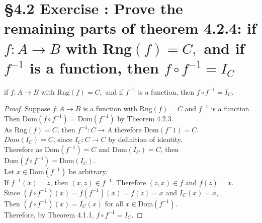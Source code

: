 \documentclass[a4paper,11pt]{article}
\begin{document}
\section*{\S 4.2 Exercise : Prove the remaining parts of theorem 4.2.4: if \(f:A\rightarrow B\) with Rng\({(f)=C,}\) and if \(f^{-1}\) is a function, then \(f \circ 
f^{-1}=I_{C}\)}
\begin{theorem1}
if \(f: A \rightarrow B\) with Rng\({(f)=C,}\) and if \(f^{-1}\) is a function, then \(f \circ 
f^{-1}=I_{C}\).
   \begin{proof}
Suppose \(f:A \rightarrow B\) is a function with \(\text{Rng}{(f)}=C\) and \(f^{-1}\) is a function.\\
Then \(\text{Dom}{(f \circ f^{-1})} = \text{Dom}{(f^{-1})}\) by Theorem 4.2.3.\\
As \(\text{Rng}{(f)} = C\), then \(f^{-1}:C \rightarrow A\) therefore \(\text{Dom}{(f^-1)} = 
C\).\\
\(Dom{(I_{C})} = C\), since \(I_{C}: C \rightarrow C\) by definition of 
identity.\\
Therefore as \(\text{Dom}{(f^{-1})} = C\) and \(\text{Dom}{(I_C)} = C\), then \(\text{Dom}{(f \circ f^{-1})} = 
\text{Dom}{(I_C)}\).\\
Let \(x \in \text{Dom}{(f^{-1})}\) be arbitrary.\\
If \(f^{-1}{(x)} = z\), then \({(x,z)} \in f^{-1}\). Therefore \({(z,x)} \in f\) 
and \(f{(z)} = x\).\\
Since \({(f \circ f^{-1})}{(x)} = f{(f^{-1}){(x)}} = f{(z)} = x\) and \(I_{C}{(x)} = 
x\),\\
Then \({(f \circ f^{-1})}{(x)} = I_{C}{(x)}\) for all \(x \in 
\text{Dom}{(f^{-1})}\).\\
Therefore, by Theorem 4.1.1, \(f \circ f^{-1} = I_{C}\). 
     \end{proof}
  \end{theorem1}
  \newpage
\setcounter{ProblemCounter}{9}
\end{document}

